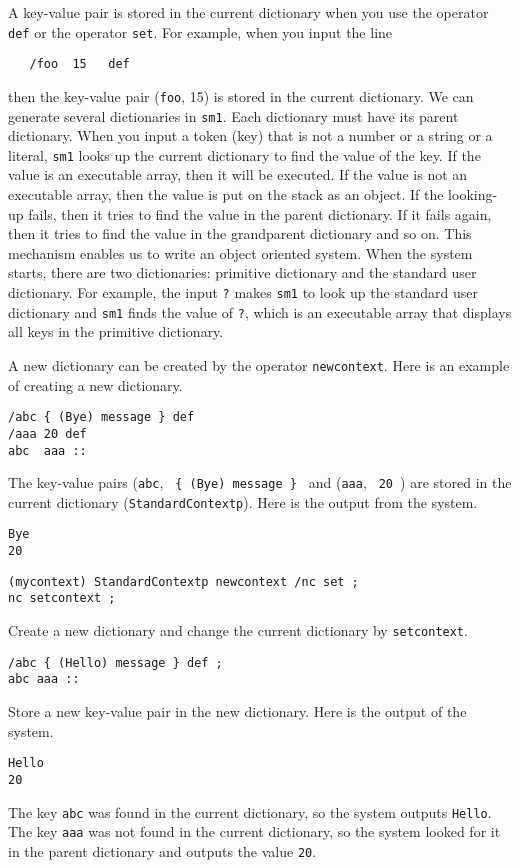 A key-value pair is stored in the current dictionary
when you use the operator {\tt def}
or the operator {\tt set}.
For example,
when you input the line
\begin{verbatim}
   /foo  15   def
\end{verbatim}
then the key-value pair
({\tt foo}, 15) is stored in the current dictionary.
We can generate several dictionaries in {\tt sm1}.
Each dictionary must have its parent dictionary.
When you input a token (key) that is not a number or a string or a literal,
{\tt sm1} looks up the current dictionary to find the value of the key.
If the value is an executable array, then it will be executed.
If the value is not an executable array, then the value is put on the stack
as an object.
If the looking-up fails, 
then it tries to find the value in the parent dictionary.
If it fails again, then it tries to find the value in the grandparent
dictionary and so on.
This mechanism enables us to write an object oriented system.
When the system starts, there are two dictionaries:
primitive dictionary and the standard user dictionary.
For example, the input {\tt ?} makes {\tt sm1} to look up
the standard user dictionary and {\tt sm1} finds the value of {\tt ?},
which is an executable array that displays all keys in the primitive
dictionary.

A new dictionary can be created by the operator {\tt newcontext}.
Here is an example of creating a new dictionary.
\begin{verbatim}
/abc { (Bye) message } def 
/aaa 20 def 
abc  aaa ::
\end{verbatim}
The key-value pairs ({\tt abc}, \verb+ { (Bye) message } +
and
({\tt aaa}, \verb+ 20 +)
are stored in the current dictionary ({\tt StandardContextp}).
Here is the output from the system.
{\footnotesize \begin{verbatim}
Bye
20
\end{verbatim} }
\begin{verbatim}
(mycontext) StandardContextp newcontext /nc set ;
nc setcontext ;
\end{verbatim}
Create a new dictionary and change the current dictionary
by {\tt setcontext}.
\begin{verbatim}
/abc { (Hello) message } def ;
abc aaa ::
\end{verbatim}
Store a new key-value pair in the new dictionary.
Here is the output of the system.
{\footnotesize \begin{verbatim}
Hello
20
\end{verbatim} }
The key {\tt abc} was found in the current dictionary, so
the system outputs {\tt Hello}.
The key {\tt aaa} was not found in the current dictionary,
so the system looked for it in the parent dictionary and
outputs the value {\tt 20}.


